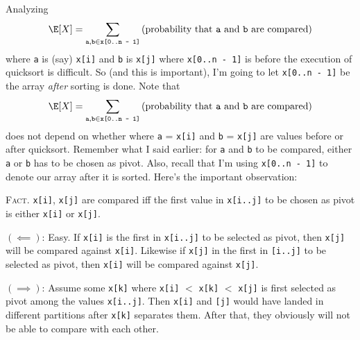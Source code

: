 Analyzing
\begin{align*}
  \E[X]
  = \sum_{\texttt{a},\texttt{b} \in \texttt{x[0..n - 1]}}
    \text{(probability that \texttt{a} and \texttt{b} are compared)}
\end{align*}
where \verb!a! is (say) \verb!x[i]!
and \verb!b! is \verb!x[j]! where \verb!x[0..n - 1]! is before
the execution of quicksort is difficult.
So (and this is important), I'm going to let \verb!x[0..n - 1]! be the
array \textit{after} sorting is done.
Note that
\begin{align*}
  \E[X]
  = \sum_{\texttt{a},\texttt{b} \in \texttt{x[0..n - 1]}}
  \text{(probability that \texttt{a} and \texttt{b} are compared)}
\end{align*}
does not depend on whether
where \verb!a! = \verb!x[i]!
and \verb!b! = \verb!x[j]! are values before or after quicksort.
Remember what I said earlier: for \verb!a! and \verb!b! to be compared,
either \verb!a! or \verb!b! has to be chosen as pivot.
Also, recall that I'm using \verb!x[0..n - 1]! to denote our array
after it is sorted.
Here's the important
observation:


\textsc{Fact}.
\verb!x[i]!, \verb!x[j]! are compared iff the first value in
\verb!x[i..j]! to be chosen as pivot is either \verb!x[i]! or \verb!x[j]!.

$(\impliedby)$:
Easy.
If \verb!x[i]! is the first in \verb!x[i..j]! to be selected as pivot,
then \verb!x[j]! will be compared against \verb!x[i]!.
Likewise if \verb!x[j]! in the first in \verb![i..j]! to be selected as
pivot, then \verb!x[i]! will be compared against \verb!x[j]!.

$(\implies)$:
Assume some \verb!x[k]! where \verb!x[i]! $<$ \verb!x[k]! $<$ \verb!x[j]!
is first selected as pivot among the values \verb!x[i..j]!.
Then \verb!x[i]! and \verb![j]! would have landed in different partitions
after \verb!x[k]! separates them.
After that, they obviously will not be able to compare with each other.

